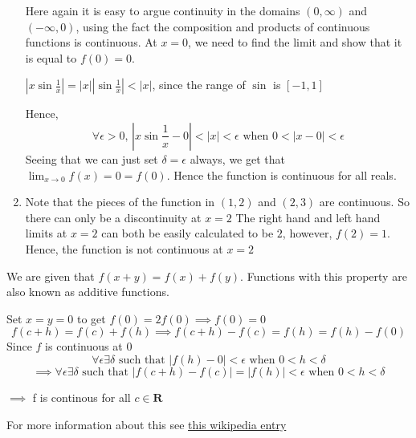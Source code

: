\documentclass{article}
\begin{document}
\begin{enumerate}
                            Here again it is easy to argue continuity in the domains $(0, \infty)$ and $(-\infty, 0)$, using the fact the composition and products of continuous functions is continuous. At $x=0$, we need to find the limit and show that it is equal to $f(0) = 0$.


                            $|x\sin \frac{1}{x}| = |x||\sin \frac{1}{x}| < |x|$, since the range of $\sin$ is $[-1, 1]$

                            Hence,
                            $$\forall \epsilon>0, \, |x\sin \frac{1}{x} - 0| < |x| < \epsilon  \text{ when } 0 < |x-0| < \epsilon$$
                            Seeing that we can just set $\delta = \epsilon$ always, we get that $\lim_{x \to 0} f(x) = 0 = f(0)$. Hence the function is continuous for all reals.
                    \item Note that the pieces of the function in $(1,2)$ and $(2,3)$ are continuous. So there can only be a discontinuity at $x = 2$
                            The right hand and left hand limits at $x = 2$ can both be easily calculated to be $2$, however, $f(2) = 1$. Hence, the function is not continuous at $x=2$
        \end{enumerate}
\item We are given that $f(x+y) = f(x) + f(y)$. Functions with this property are also known as additive functions.

        Set $x=y=0$ to get $f(0) = 2f(0) \implies f(0) = 0$
$$f(c+h) = f(c) + f(h) \implies f(c+h)-f(c) = f(h) = f(h)-f(0)$$
    Since $f$ is continuous at $0$
    $$ \forall \epsilon \exists \delta  \text{ such that }|f(h)-0| < \epsilon  \text{ when } 0 < h < \delta$$
    $$\implies \forall \epsilon \exists \delta  \text{ such that } |f(c+h) - f(c)| = |f(h)| < \epsilon\text{ when } 0 < h < \delta$$
    \begin{center}$\implies$ f is continous for all $c \in \mathbf{R}$    

    \end{center}
    For more information about this see \href{https://en.wikipedia.org/wiki/Cauchy\%27s_functional_equation}{this wikipedia entry}
\end{document}
